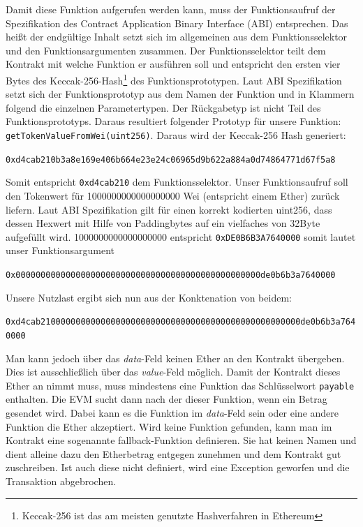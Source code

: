 \documentclass[runningheads]{llncs}
\begin{document}
Damit diese Funktion aufgerufen werden kann, muss der Funktionsaufruf der Spezifikation des Contract Application Binary Interface (ABI) entsprechen. %
Das heißt der endgültige Inhalt setzt sich im allgemeinen aus dem Funktionsselektor und den Funktionsargumenten zusammen. Der Funktionsselektor teilt dem Kontrakt mit welche Funktion er ausführen soll und entspricht den ersten vier Bytes des Keccak-256-Hash\footnote{Keccak-256 ist das am meisten genutzte Hashverfahren in Ethereum} des Funktionsprototypen. Laut ABI Spezifikation setzt sich der Funktionsprototyp aus dem Namen der Funktion und in Klammern folgend die einzelnen Parametertypen. Der Rückgabetyp ist nicht Teil des Funktionsprototyps.
Daraus resultiert folgender Prototyp für unsere Funktion: \texttt{getTokenValueFromWei(uint256)}.
Daraus wird der Keccak-256 Hash generiert:
\begin{center}
  \texttt{0xd4cab210b3a8e169e406b664e23e24c06965d9b622a884a0d74864771d67f5a8}
\end{center}
Somit entspricht \texttt{0xd4cab210} dem Funktionsselektor.
Unser Funktionsaufruf soll den Tokenwert für 1000000000000000000 Wei (entspricht einem Ether) zurück liefern.
Laut ABI Spezifikation gilt für einen korrekt kodierten uint256, dass dessen Hexwert mit Hilfe von Paddingbytes auf ein vielfaches von 32Byte aufgefüllt wird. 1000000000000000000 entspricht \texttt{0xDE0B6B3A7640000} somit lautet unser Funktionsargument 
\begin{center}
  \texttt{0x0000000000000000000000000000000000000000000000000de0b6b3a7640000}
\end{center}
Unsere Nutzlast ergibt sich nun aus der Konktenation von beidem:
\begingroup
  \fontsize{8pt}{10pt}\selectfont
  \begin{center}
    \texttt{0xd4cab2100000000000000000000000000000000000000000000000000de0b6b3a7640000}
  \end{center}
\endgroup

Man kann jedoch über das \textit{data}-Feld keinen Ether an den Kontrakt übergeben. Dies ist ausschließlich über das \textit{value}-Feld möglich. Damit der Kontrakt dieses Ether an nimmt muss, muss mindestens eine Funktion das Schlüsselwort \texttt{payable} enthalten. Die EVM sucht dann nach der dieser Funktion, wenn ein Betrag gesendet wird. Dabei kann es die Funktion im \textit{data}-Feld sein oder eine andere Funktion die Ether akzeptiert. Wird keine Funktion gefunden, kann man im Kontrakt eine sogenannte fallback-Funktion definieren. Sie hat keinen Namen und dient alleine dazu den Etherbetrag entgegen zunehmen und dem Kontrakt gut zuschreiben. Ist auch diese nicht definiert, wird eine Exception geworfen und die Transaktion abgebrochen. %
\end{document}
